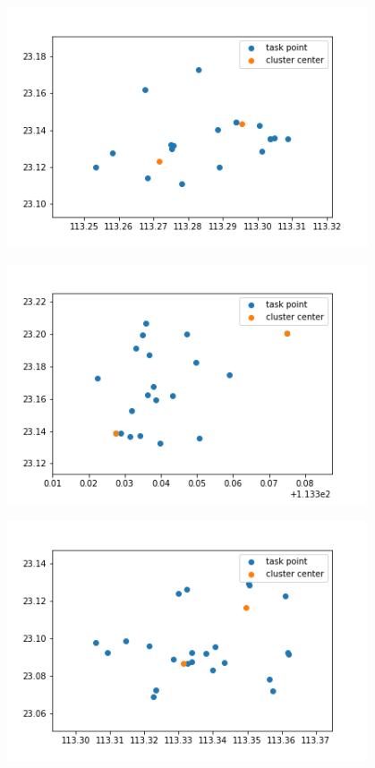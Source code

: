 \begin{figure}
\begin{minipage}[c]{0.3\textwidth}
        \label{fig:sample-figure-c}
    \end{minipage}\\
    \begin{minipage}[c]{0.3\textwidth}
        \centering
        \includegraphics[width=0.95\textwidth]{96.png}
        \label{fig:sample-figure-a}
    \end{minipage}
    \begin{minipage}[c]{0.3\textwidth}
        \centering
        \includegraphics[width=0.95\textwidth]{113.png}
        \label{fig:sample-figure-b}
    \end{minipage}
    \begin{minipage}[c]{0.3\textwidth}
        \centering
        \includegraphics[width=0.95\textwidth]{120.png}

\end{minipage}
\end{figure}
